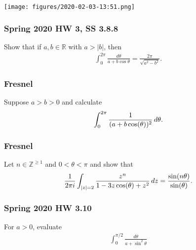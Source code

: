 \texttt{[image: figures/2020-02-03-13:51.png]}\\

\hypertarget{spring-2020-hw-3-ss-3.8.8}{%
\subsubsection{Spring 2020 HW 3, SS
3.8.8}\label{spring-2020-hw-3-ss-3.8.8}}

Show that if \(a,b\in {\mathbb{R}}\) with
\(a > {\left\lvert {b} \right\rvert}\), then
\begin{align*}
\int_{0}^{2 \pi} \frac{d \theta}{a+b \cos \theta}=\frac{2 \pi}{\sqrt{a^{2}-b^{2}}}
.\end{align*}

\hypertarget{fresnel}{%
\subsubsection{Fresnel}\label{fresnel}}

\begin{problem}[?]

Suppose \(a>b>0\) and calculate
\begin{align*}
\int_0^{2\pi} {1 \over (a+b\cos(\theta))^2} \,d\theta
.\end{align*}

\end{problem}

\hypertarget{fresnel-1}{%
\subsubsection{Fresnel}\label{fresnel-1}}

\begin{problem}[?]

Let \(n\in {\mathbb{Z}}^{\geq 1}\) and \(0<\theta<\pi\) and show that
\begin{align*}
{1\over 2\pi i} \int_{{\left\lvert {z} \right\rvert} = 2} {z^n \over 1 -3z\cos(\theta) + z^2} \,dz = {\sin(n\theta) \over \sin(\theta)}
.\end{align*}

\end{problem}

\hypertarget{spring-2020-hw-3.10}{%
\subsubsection{Spring 2020 HW 3.10}\label{spring-2020-hw-3.10}}

For \(a> 0\), evaluate
\begin{align*}
\int_0^{\pi/2} \frac{d\theta}{a + \sin^2 \theta}
\end{align*}

